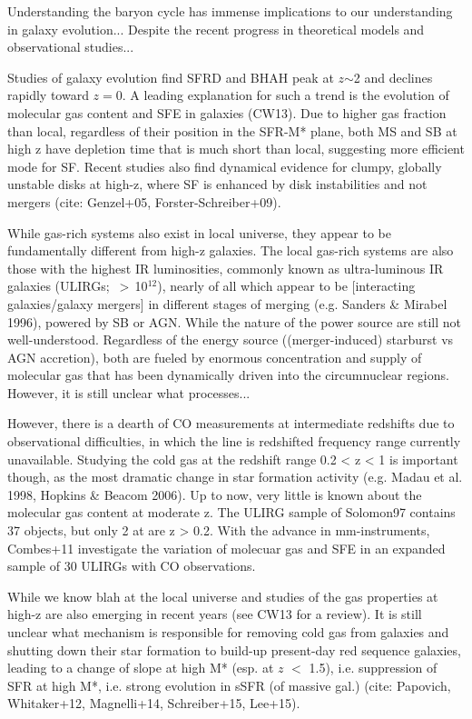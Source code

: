 Understanding the baryon cycle has immense implications to our understanding in galaxy evolution...
Despite the recent progress in theoretical models and observational studies...

Studies of galaxy evolution find SFRD and BHAH peak at
$z$$\sim$2 and declines rapidly toward $z$$=$0. A leading explanation for such
a trend is the evolution of molecular gas content and SFE in galaxies (CW13). Due to higher gas fraction than local, regardless of their position in the SFR-M* plane, both MS and SB at high z have depletion time that is much short than local, suggesting more efficient mode for SF. Recent studies also find dynamical evidence for clumpy, globally unstable disks at high-z,
where SF is enhanced by disk instabilities and not mergers (cite: Genzel+05, Forster-Schreiber+09).

While gas-rich systems also exist in local universe, they appear to be
fundamentally different from high-z galaxies.
The local gas-rich systems are also those with the highest IR luminosities, commonly known as ultra-luminous IR galaxies (ULIRGs; \LIR\,$>$\,10$^{12}$\Lsun), nearly of all which appear to be [interacting galaxies/galaxy mergers] in different stages of merging (e.g. Sanders & Mirabel 1996), powered by SB or AGN. While the nature of the power source are still not well-understood.
Regardless of the energy source ((merger-induced) starburst vs AGN accretion), both
are fueled by enormous concentration and supply of molecular gas that has been dynamically driven into the circumnuclear regions. However, it is still unclear what processes...


However, there is a dearth of CO measurements at intermediate redshifts due to observational difficulties, in which the \aco line is redshifted frequency range currently unavailable.
Studying the cold gas at the redshift range 0.2 < z < 1 is important though, as the most dramatic change in star formation activity (e.g. Madau et al. 1998, Hopkins & Beacom 2006). Up to now, very little is known about the molecular gas content at moderate z. The ULIRG sample of Solomon97 contains 37 objects, but only 2 at are z > 0.2. With the advance in mm-instruments, Combes+11 investigate the variation of molecuar gas and SFE in an expanded sample of 30 ULIRGs with CO observations.


While we know blah at the local universe and studies of the gas properties at
high-z are also emerging in recent years (see CW13 for a review). It is still
unclear what mechanism is responsible for removing cold gas from galaxies and
shutting down their star formation to build-up present-day red sequence
galaxies, leading to a change of slope at high M* (esp. at $z$ $<$ 1.5),  i.e.
suppression of SFR at high M*, i.e. strong evolution in sSFR (of massive gal.)
(cite: Papovich, Whitaker+12, Magnelli+14, Schreiber+15, Lee+15).


